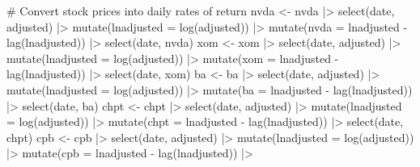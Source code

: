 \documentclass[
  letterpaper,
]{book}
\newenvironment{Shaded}{\begin{snugshade}}{\end{snugshade}}
\newcommand{\AttributeTok}[1]{\textcolor[rgb]{0.40,0.45,0.13}{#1}}
\newcommand{\CommentTok}[1]{\textcolor[rgb]{0.37,0.37,0.37}{#1}}
\newcommand{\FunctionTok}[1]{\textcolor[rgb]{0.28,0.35,0.67}{#1}}
\newcommand{\NormalTok}[1]{\textcolor[rgb]{0.00,0.23,0.31}{#1}}
\newcommand{\OtherTok}[1]{\textcolor[rgb]{0.00,0.23,0.31}{#1}}
\newcommand{\SpecialCharTok}[1]{\textcolor[rgb]{0.37,0.37,0.37}{#1}}
\begin{document}
\begin{Shaded}
\begin{Highlighting}[]
\CommentTok{\# Convert stock prices into daily rates of return}
\NormalTok{nvda }\OtherTok{\textless{}{-}}\NormalTok{ nvda }\SpecialCharTok{|\textgreater{}}  
    \FunctionTok{select}\NormalTok{(date, adjusted)  }\SpecialCharTok{|\textgreater{}}  
    \FunctionTok{mutate}\NormalTok{(}\AttributeTok{lnadjusted =} \FunctionTok{log}\NormalTok{(adjusted)) }\SpecialCharTok{|\textgreater{}}  
    \FunctionTok{mutate}\NormalTok{(}\AttributeTok{nvda =}\NormalTok{ lnadjusted }\SpecialCharTok{{-}} \FunctionTok{lag}\NormalTok{(lnadjusted)) }\SpecialCharTok{|\textgreater{}}  
    \FunctionTok{select}\NormalTok{(date, nvda)}
\NormalTok{xom }\OtherTok{\textless{}{-}}\NormalTok{ xom }\SpecialCharTok{|\textgreater{}}  
    \FunctionTok{select}\NormalTok{(date, adjusted) }\SpecialCharTok{|\textgreater{}}  
    \FunctionTok{mutate}\NormalTok{(}\AttributeTok{lnadjusted =} \FunctionTok{log}\NormalTok{(adjusted)) }\SpecialCharTok{|\textgreater{}}  
    \FunctionTok{mutate}\NormalTok{(}\AttributeTok{xom =}\NormalTok{ lnadjusted }\SpecialCharTok{{-}} \FunctionTok{lag}\NormalTok{(lnadjusted)) }\SpecialCharTok{|\textgreater{}}  
    \FunctionTok{select}\NormalTok{(date, xom)}
\NormalTok{ba }\OtherTok{\textless{}{-}}\NormalTok{ ba }\SpecialCharTok{|\textgreater{}}  
    \FunctionTok{select}\NormalTok{(date, adjusted) }\SpecialCharTok{|\textgreater{}}  
    \FunctionTok{mutate}\NormalTok{(}\AttributeTok{lnadjusted =} \FunctionTok{log}\NormalTok{(adjusted)) }\SpecialCharTok{|\textgreater{}}  
    \FunctionTok{mutate}\NormalTok{(}\AttributeTok{ba =}\NormalTok{ lnadjusted }\SpecialCharTok{{-}} \FunctionTok{lag}\NormalTok{(lnadjusted)) }\SpecialCharTok{|\textgreater{}}  
    \FunctionTok{select}\NormalTok{(date, ba)}
\NormalTok{chpt }\OtherTok{\textless{}{-}}\NormalTok{ chpt }\SpecialCharTok{|\textgreater{}}  
    \FunctionTok{select}\NormalTok{(date, adjusted) }\SpecialCharTok{|\textgreater{}}  
    \FunctionTok{mutate}\NormalTok{(}\AttributeTok{lnadjusted =} \FunctionTok{log}\NormalTok{(adjusted)) }\SpecialCharTok{|\textgreater{}}  
    \FunctionTok{mutate}\NormalTok{(}\AttributeTok{chpt =}\NormalTok{ lnadjusted }\SpecialCharTok{{-}} \FunctionTok{lag}\NormalTok{(lnadjusted)) }\SpecialCharTok{|\textgreater{}}  
    \FunctionTok{select}\NormalTok{(date, chpt)}
\NormalTok{cpb }\OtherTok{\textless{}{-}}\NormalTok{ cpb }\SpecialCharTok{|\textgreater{}}  
    \FunctionTok{select}\NormalTok{(date, adjusted) }\SpecialCharTok{|\textgreater{}}  
    \FunctionTok{mutate}\NormalTok{(}\AttributeTok{lnadjusted =} \FunctionTok{log}\NormalTok{(adjusted)) }\SpecialCharTok{|\textgreater{}}  
    \FunctionTok{mutate}\NormalTok{(}\AttributeTok{cpb =}\NormalTok{ lnadjusted }\SpecialCharTok{{-}} \FunctionTok{lag}\NormalTok{(lnadjusted)) }\SpecialCharTok{|\textgreater{}}  

\end{Highlighting}
\end{Shaded}
\end{document}
